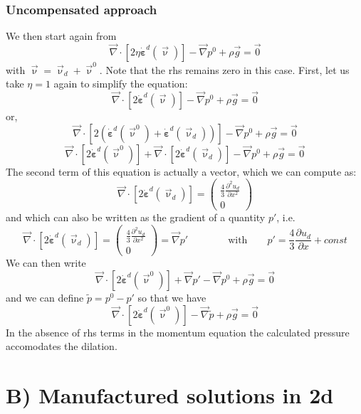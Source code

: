 \subsubsection*{Uncompensated approach}
We then start again from 
\[
\vec\nabla \cdot [2 \eta \dot{\bm \varepsilon}^d(\vec\upnu)]  -\vec\nabla p^0 + \rho \vec{g} = \vec{0}
\]
with $\vec\upnu=\vec\upnu_d+\vec\upnu^0$. Note that the rhs remains zero in this case.
First, let us take $\eta=1$ again to simplify the equation:
\[
\vec\nabla \cdot [2  \dot{\bm \varepsilon}^d(\vec\upnu)]  -\vec\nabla p^0 + \rho \vec{g} = \vec{0}
\]
or,
\[
\vec\nabla \cdot [2  (\dot{\bm \varepsilon}^d(\vec\upnu^0) +\dot{\bm \varepsilon}^d(\vec\upnu_d) ) ]  
-\vec\nabla p^0 + \rho \vec{g} = \vec{0}
\]
\[
\vec\nabla \cdot [2  \dot{\bm \varepsilon}^d(\vec\upnu^0)  ]  
+\vec\nabla \cdot [2  \dot{\bm \varepsilon}^d(\vec\upnu_d)  ]  
-\vec\nabla p^0 + \rho \vec{g} = \vec{0}
\]
The second term of this equation is actually a vector, which we can compute as:
\[
\vec\nabla \cdot [2  \dot{\bm \varepsilon}^d(\vec\upnu_d)  ]  = 
\left(\begin{array}{c}
 \frac43 \frac{\partial^2 u_d}{\partial x^2}   \\
 0
\end{array}\right)
\]
and which can also be written as the gradient of a quantity $p'$, i.e.
\[
\vec\nabla \cdot [2  \dot{\bm \varepsilon}^d(\vec\upnu_d)  ]  = 
\left(\begin{array}{c}
 \frac43 \frac{\partial^2 u_d}{\partial x^2}   \\
 0
\end{array}\right)
=
\vec\nabla p' 
\qquad
\qquad
\text{with}
\qquad
 p'= \frac43 \frac{\partial u_d}{\partial x}   + const
\]
We can then write
\[
\vec\nabla \cdot [2  \dot{\bm \varepsilon}^d(\vec\upnu^0)  ]  
+\vec\nabla p' -\vec\nabla p^0 + \rho \vec{g} = \vec{0}
\]
and we can define $\tilde{p}=p^0-p'$ so that we have
\[
\vec\nabla \cdot [2  \dot{\bm \varepsilon}^d(\vec\upnu^0)  ]  
-\vec\nabla \tilde{p} + \rho \vec{g} = \vec{0}
\]
In the absence of rhs terms in the momentum equation
the calculated pressure accomodates the dilation.








\newpage
\section*{B) Manufactured solutions in 2d}

